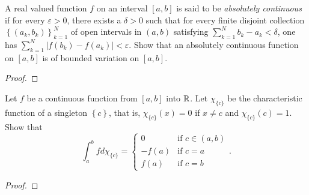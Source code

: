 \begin{problem}
A real valued function $f$ on an interval $[a,b]$ is said to be
\emph{absolutely continuous} if for every $\varepsilon>0$, there exists a
$\delta>0$ such that for every finite disjoint collection
$\left\{(a_k,b_k)\right\}_{k=1}^N$ of open intervals in $(a,b)$ satisfying
$\sum_{k=1}^Nb_k-a_k<\delta$, one has
$\sum_{k=1}^N\left|f(b_k)-f(a_k)\right|<\varepsilon$. Show that an
absolutely continuous function on $[a,b]$ is of bounded variation on
$[a,b]$.
\end{problem}
\begin{proof}
\end{proof}

\begin{problem}
Let $f$ be a continuous function from $[a,b]$ into $\mathbb{R}$. Let
$\chi_{\{c\}}$ be the characteristic function of a singleton
$\left\{c\right\}$, that is, $\chi_{\{c\}}(x)=0$ if $x\neq c$ and
$\chi_{\{c\}}(c)=1$. Show that
\[
\int_a^b f d \chi_{\{c\}}=
\begin{cases}
0&\text{if $c\in(a,b)$}\\
-f(a)&\text{if $c=a$}\\
f(a)&\text{if $c=b$}
\end{cases}.
\]
\end{problem}
\begin{proof}
\end{proof}

